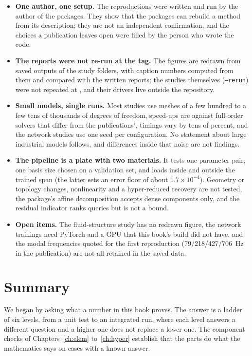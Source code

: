 \begin{limitsbox}
\begin{itemize}
\item \textbf{One author, one setup.} The reproductions were written and run by the author of the packages. They show that the packages can rebuild a method from its description; they are not an independent confirmation, and the choices a publication leaves open were filled by the person who wrote the code.
\item \textbf{The reports were not re-run at the tag.} The figures are redrawn from saved outputs of the study folders, with caption numbers computed from them and compared with the written reports; the studies themselves (\texttt{--rerun}) were not repeated at \booktag{}, and their drivers live outside the repository.
\item \textbf{Small models, single runs.} Most studies use meshes of a few hundred to a few tens of thousands of degrees of freedom, speed-ups are against full-order solvers that differ from the publications', timings vary by tens of percent, and the network studies use one seed per configuration. No statement about large industrial models follows, and differences inside that noise are not findings.
\item \textbf{The pipeline is a plate with two materials.} It tests one parameter pair, one basis size chosen on a validation set, and loads inside and outside the trained span (the latter sets an error floor of about $1.7\times10^{-4}$). Geometry or topology changes, nonlinearity and a hyper-reduced recovery are not tested, the package's affine decomposition accepts dense components only, and the residual indicator ranks queries but is not a bound.
\item \textbf{Open items.} The fluid-structure study has no redrawn figure, the network trainings need PyTorch and a GPU that this book's build did not have, and the modal frequencies quoted for the first reproduction (79/218/427/706~Hz in the publication) are not all retained in the saved data.
\end{itemize}
\end{limitsbox}

\section{Summary}\label{sec:vf-summary}

We began by asking what a number in this book proves. The answer is a ladder of six levels, from a unit test to an integrated run, where each level answers a different question and a higher one does not replace a lower one. The component checks of Chapters~\ref{ch:elem} to~\ref{ch:hyper} establish that the parts do what the mathematics says on cases with a known answer.


